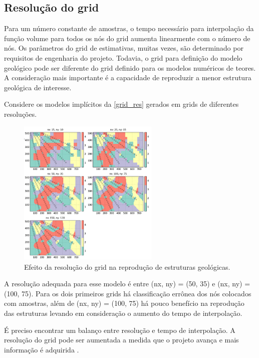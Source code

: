 \subsection{Resolução do grid}

Para um número constante de amostras, o tempo necessário para interpolação da função volume para todos os nós do grid aumenta linearmente com o número de nós. Os parâmetros do grid de estimativas, muitas vezes, são determinado por requisitos de engenharia do projeto. Todavia, o grid para definição do modelo geológico pode ser diferente do grid definido para os modelos numéricos de teores. A consideração mais importante é a capacidade de reproduzir a menor estrutura geológica de interesse.

Considere os modelos implícitos da \autoref{grid_res} gerados em grids de diferentes resoluções.

\begin{figure}[!htb]
	\caption{\label{grid_res}Efeito da resolução do grid na reprodução de estruturas geológicas.}
	\begin{center}
		\includegraphics[width=0.6\textwidth]{capitulo_2/grid_res.png}
	\end{center}
\end{figure}

A resolução adequada para esse modelo é entre (nx, ny) = (50, 35) e (nx, ny) = (100, 75). Para os dois primeiros grids há classificação errônea dos nós colocados com amostras, além de (nx, ny) = (100, 75) há pouco benefício na reprodução das estruturas levando em consideração o aumento do tempo de interpolação.

É preciso encontrar um balanço entre resolução e tempo de interpolação. A resolução do grid pode ser aumentada a medida que o projeto avança e mais informação é adquirida \cite{martin2017implicitmodeling}.

